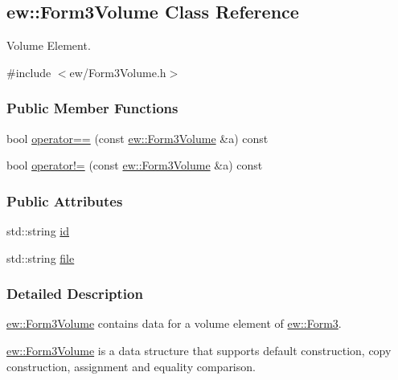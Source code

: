 \hypertarget{classew_1_1Form3Volume}{
\subsection{ew::Form3Volume Class Reference}
\label{classew_1_1Form3Volume}
}


Volume Element.  




{\ttfamily \#include $<$ew/Form3Volume.h$>$}

\subsubsection*{Public Member Functions}
\begin{DoxyCompactItemize}
\item 
bool \hyperlink{classew_1_1Form3Volume_a9f6f367d8074820e106ad51a9264b668}{operator==} (const \hyperlink{classew_1_1Form3Volume}{ew::Form3Volume} \&a) const 
\item 
bool \hyperlink{classew_1_1Form3Volume_a535ea89983ec03ae9e7aeae3b38f7c7c}{operator!=} (const \hyperlink{classew_1_1Form3Volume}{ew::Form3Volume} \&a) const 
\end{DoxyCompactItemize}
\subsubsection*{Public Attributes}
\begin{DoxyCompactItemize}
\item 
std::string \hyperlink{classew_1_1Form3Volume_aede415929600c673c12b8d99f600ea37}{id}
\item 
std::string \hyperlink{classew_1_1Form3Volume_a7d4cf297939871fcf11e037758d5e2fe}{file}
\end{DoxyCompactItemize}


\subsubsection{Detailed Description}
\hyperlink{classew_1_1Form3Volume}{ew::Form3Volume} contains data for a volume element of \hyperlink{classew_1_1Form3}{ew::Form3}.

\hyperlink{classew_1_1Form3Volume}{ew::Form3Volume} is a data structure that supports default construction, copy construction, assignment and equality comparison. 


